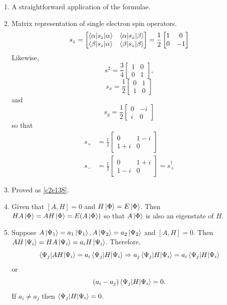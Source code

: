 \begin{enumerate}
\item\label{c2p32} A straightforward application of the formulae.

\item\label{c2p33} Matrix representation of single electron spin operators.
\[
s_z = \begin{bmatrix} \braket{\alpha|s_z|\alpha} & \braket{\alpha|s_z|\beta} \\
\braket{\beta|s_z|\alpha} & \braket{\beta|s_z|\beta} \end{bmatrix}
= \frac{1}{2}\begin{bmatrix}1 & 0 \\ 0 & -1\end{bmatrix}
\]
Likewise,
\[
s^2 = \frac{3}{4}\begin{bmatrix}1 & 0 \\ 0 & 1\end{bmatrix},
\]
\[
s_x = \frac{1}{2}\begin{bmatrix}0 & 1 \\ 1 & 0\end{bmatrix}
\]
and
\[
s_y = \frac{1}{2}\begin{bmatrix}0 & -i \\ i & 0\end{bmatrix}
\]
so that
\[
\begin{aligned}
s_+ &= \frac{1}{2}\begin{bmatrix}0 & 1 - i \\ 1 + i & 0 \end{bmatrix} \\
s_- &= \frac{1}{2}\begin{bmatrix}0 & 1 + i \\ 1 - i & 0 \end{bmatrix} = 
       s_+^\dagger 
\end{aligned}
\]

\item\label{c2p34} Proved as \eqref{c2e138}.

\item\label{c2p35} Given that $[A, H] = 0$ and $H\ket{\Phi} = E\ket{\Phi}$.
Then $HA\ket{\Phi} = AH\ket{\Phi} = E(A\ket{\Phi})$ so that $A\ket{\Phi}$ is
also an eigenstate of $H$.

\item\label{c2p36} Suppose $A\ket{\Psi_1} = a_1\ket{\Psi_1}, A\ket{\Psi_2} = 
a_2\ket{\Psi_2}$ and $[A, H] = 0$. Then $AH\ket{\Psi_i} = HA\ket{\Psi_i} = 
a_iH\ket{\Psi_i}$. Therefore,
\[
\braket{\Psi_j|AH|\Psi_i} = a_i\braket{\Psi_j|H|\Psi_i} \Rightarrow
a_j\braket{\Psi_j|H|\Psi_i} = a_i\braket{\Psi_j|H|\Psi_i}
\]
or 
\[
(a_i - a_j)\braket{\Psi_j|H|\Psi_i} = 0.
\]
If $a_i \ne a_j$ then $\braket{\Psi_j|H|\Psi_i} = 0$.


\end{enumerate}
